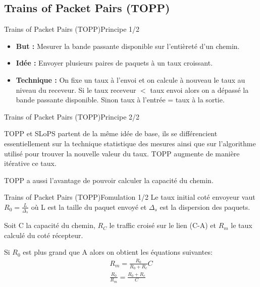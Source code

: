 \documentclass[compress]{beamer}
\begin{document}
\subsection{Trains of Packet Pairs (TOPP)}
\begin{frame}{Trains of Packet Pairs (TOPP)}{Principe 1/2}
\begin{itemize}
\item \textbf{But :}  Mesurer la {\color{red}bande passante disponible} sur l'entièreté d'un chemin.
\pause
\item \textbf{Idée :}  Envoyer plusieurs paires de paquets à un taux
croissant.
\pause
\item \textbf{Technique :} On fixe un taux à l'envoi et on calcule à
nouveau le taux au niveau du receveur. Si le taux receveur $<$ taux envoi alors on a dépassé la bande passante disponible.
Sinon taux à l'entrée = taux à la sortie.
\end{itemize}
\end{frame}
\begin{frame}{Trains of Packet Pairs (TOPP)}{Principe 2/2}

TOPP et SLoPS partent de la même idée de base, ils se différencient
essentiellement sur la technique statistique des mesures ainsi que sur
l'algorithme utilisé pour trouver la nouvelle valeur du taux.
TOPP augmente de manière itérative ce taux.

TOPP a aussi l'avantage de pouvoir calculer la capacité du chemin.

\end{frame}
\begin{frame}{Trains of Packet Pairs (TOPP)}{Fomulation 1/2}
Le taux initial coté envoyeur vaut
$R_0 = \frac{L}{\Delta_s}$ où L est la taille du paquet envoyé et $\Delta_s$ est la dispersion des paquets.

Soit C la capacité du chemin, $R_C$ le traffic croisé sur le lien (C-A) et 
$R_m$ le taux calculé du coté récepteur.

Si $R_0$ est plus grand que A alors on obtient les équations suivantes:
\begin{align}
R_m = \frac{R_0}{R_0 + R_c}C \\
\frac{R_0}{R_m} = \frac{R_0 + R_c}{C}
\label{capa}
\end{align}
\end{frame}
\end{document}
